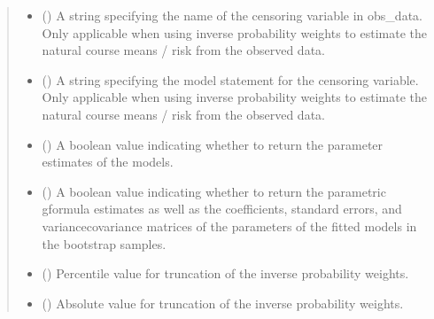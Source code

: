 \documentclass[letterpaper,10pt,english]{sphinxmanual}
\begin{document}
\begin{fulllineitems}
\begin{quote}
\begin{description}
\begin{itemize}
\item {} 
\sphinxAtStartPar
{} (\sphinxstyleliteralemphasis{\sphinxupquote{, }}) \textendash{} A string specifying the name of the censoring variable in obs\_data. Only applicable when using inverse
probability weights to estimate the natural course means / risk from the observed data.

\item {} 
\sphinxAtStartPar
{} (\sphinxstyleliteralemphasis{\sphinxupquote{, }}) \textendash{} A string specifying the model statement for the censoring variable. Only applicable when using inverse
probability weights to estimate the natural course means / risk from the observed data.

\item {} 
\sphinxAtStartPar
{} (\sphinxstyleliteralemphasis{\sphinxupquote{, }}) \textendash{} A boolean value indicating whether to return the parameter estimates of the models.

\item {} 
\sphinxAtStartPar
{} (\sphinxstyleliteralemphasis{\sphinxupquote{, }}) \textendash{} A boolean value indicating whether to return the parametric g\sphinxhyphen{}formula estimates as well as the coefficients,
standard errors, and variance\sphinxhyphen{}covariance matrices of the parameters of the fitted models in the bootstrap samples.

\item {} 
\sphinxAtStartPar
{} (\sphinxstyleliteralemphasis{\sphinxupquote{, }}) \textendash{} Percentile value for truncation of the inverse probability weights.

\item {} 
\sphinxAtStartPar
{} (\sphinxstyleliteralemphasis{\sphinxupquote{, }}) \textendash{} Absolute value for truncation of the inverse probability weights.


\end{itemize}
\end{description}
\end{quote}
\end{fulllineitems}
\end{document}
